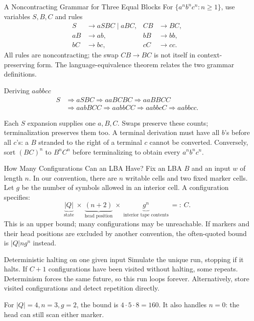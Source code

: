 \documentclass[10pt]{beamer}
\begin{document}
\begin{frame}{A Noncontracting Grammar for Three Equal Blocks}
  \small
  For $\{a^nb^nc^n:n\ge1\}$, use variables $S,B,C$ and rules
  \[
    \begin{aligned}
      S&\to aSBC\mid aBC, & CB&\to BC,\\
      aB&\to ab, & bB&\to bb,\\
      bC&\to bc, & cC&\to cc.
    \end{aligned}
  \]
  All rules are noncontracting; the swap $CB\to BC$ is not itself in
  context-preserving form. The language-equivalence theorem relates the
  two grammar definitions.
  \begin{block}{Deriving $aabbcc$}
    \[
      \begin{aligned}
        S&\Rightarrow aSBC\Rightarrow aaBCBC\Rightarrow aaBBCC\\
         &\Rightarrow aabBCC\Rightarrow aabbCC
          \Rightarrow aabbcC\Rightarrow aabbcc.
      \end{aligned}
    \]
  \end{block}
  Each $S$ expansion supplies one $a,B,C$. Swaps preserve these counts;
  terminalization preserves them too. A terminal derivation must have all
  $b$'s before all $c$'s: a $B$ stranded to the right of a terminal $c$
  cannot be converted. Conversely, sort $(BC)^n$ to $B^nC^n$ before
  terminalizing to obtain every $a^nb^nc^n$.
\end{frame}

\begin{frame}{How Many Configurations Can an LBA Have?}
  \small
  Fix an LBA $B$ and an input $w$ of length $n$. In our convention, there
  are $n$ writable cells and two fixed marker cells. Let $g$ be the number
  of symbols allowed in an interior cell. A configuration specifies:
  \[
    \underbrace{|Q|}_{\text{state}}\ \times\
    \underbrace{(n+2)}_{\text{head position}}\ \times\
    \underbrace{g^n}_{\text{interior tape contents}}
    \ =:\ C.
  \]
  This is an upper bound; many configurations may be unreachable.
  If markers and their head positions are excluded by another convention,
  the often-quoted bound is $|Q|ng^n$ instead.
  \begin{block}{Deterministic halting on one given input}
    Simulate the unique run, stopping if it halts. If $C+1$ configurations
    have been visited without halting, some repeats. Determinism forces
    the same future, so this run loops forever. Alternatively, store
    visited configurations and detect repetition directly.
  \end{block}
  For $|Q|=4,n=3,g=2$, the bound is $4\cdot5\cdot8=160$.
  It also handles $n=0$: the head can still scan either marker.
\end{frame}
\end{document}
